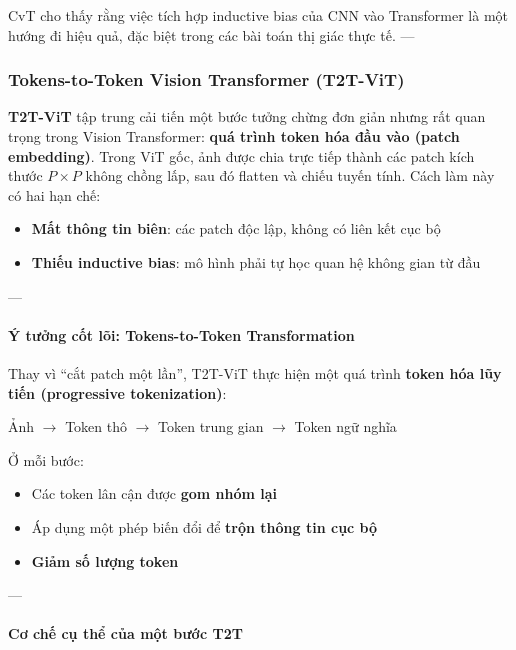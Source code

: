 CvT cho thấy rằng việc tích hợp inductive bias của CNN vào Transformer là một hướng đi hiệu quả, đặc biệt trong các bài toán thị giác thực tế.
---

\subsubsection{Tokens-to-Token Vision Transformer (T2T-ViT)}
\label{subsubsec:t2t_vit}

\textbf{T2T-ViT} \cite{Yuan2021} tập trung cải tiến một bước tưởng chừng đơn giản nhưng rất quan trọng trong Vision Transformer: \textbf{quá trình token hóa đầu vào (patch embedding)}.  
Trong ViT gốc, ảnh được chia trực tiếp thành các patch kích thước $P \times P$ không chồng lấp, sau đó flatten và chiếu tuyến tính. Cách làm này có hai hạn chế:
\begin{itemize}
	\item \textbf{Mất thông tin biên}: các patch độc lập, không có liên kết cục bộ
	\item \textbf{Thiếu inductive bias}: mô hình phải tự học quan hệ không gian từ đầu
\end{itemize}

---

\paragraph{Ý tưởng cốt lõi: Tokens-to-Token Transformation}

Thay vì “cắt patch một lần”, T2T-ViT thực hiện một quá trình \textbf{token hóa lũy tiến (progressive tokenization)}:

\begin{center}
	Ảnh $\rightarrow$ Token thô $\rightarrow$ Token trung gian $\rightarrow$ Token ngữ nghĩa
\end{center}

Ở mỗi bước:
\begin{itemize}
	\item Các token lân cận được \textbf{gom nhóm lại}
	\item Áp dụng một phép biến đổi để \textbf{trộn thông tin cục bộ}
	\item \textbf{Giảm số lượng token}
\end{itemize}

---

\paragraph{Cơ chế cụ thể của một bước T2T}


